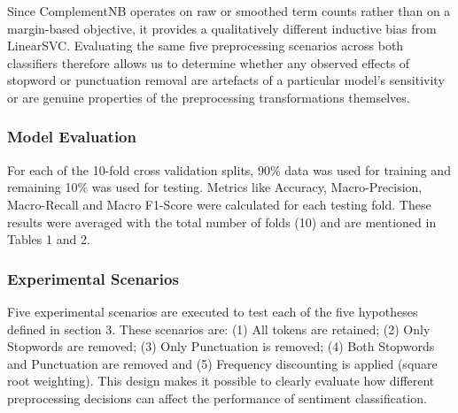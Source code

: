 \documentclass[a4paper,10pt]{article}
\begin{document}
\begin{enumerate}[label=\alph*)]
Since ComplementNB operates on raw or smoothed term counts rather than on a
margin-based objective, it provides a qualitatively different inductive bias
from LinearSVC. Evaluating the same five preprocessing scenarios across both
classifiers therefore allows us to determine whether any observed effects of
stopword or punctuation removal are artefacts of a particular model's
sensitivity or are genuine properties of the preprocessing transformations
themselves.
\end{enumerate}  
\subsubsection{Model Evaluation}
For each of the 10-fold cross validation splits, 90\% data was used for training and remaining 10\% was used for testing. Metrics like Accuracy, Macro-Precision, Macro-Recall and Macro F1-Score were calculated for each testing fold. These results were averaged with the total number of folds (10) and are mentioned in Tables 1 and 2.

\subsubsection{Experimental Scenarios}
Five experimental scenarios are executed to test each of the five hypotheses defined in section 3. These scenarios are: (1) All tokens are retained; (2) Only Stopwords are removed; (3) Only Punctuation is removed; (4) Both Stopwords and Punctuation are removed and (5) Frequency discounting is applied (square root weighting). This design makes it possible to clearly evaluate how different preprocessing decisions can affect the performance of sentiment classification.
\end{document}
